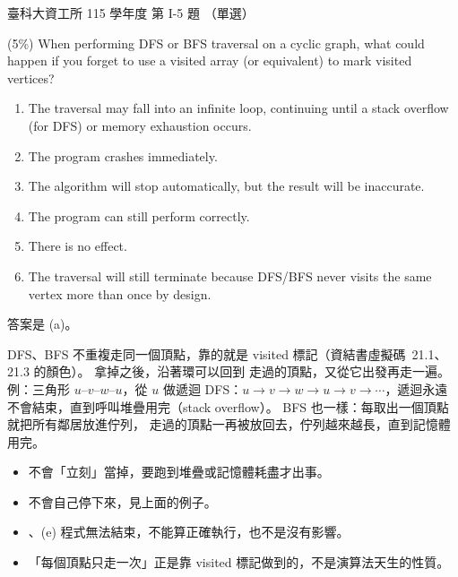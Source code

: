 \begin{pastexam}[label={px:ntust-115-ice-05}]{臺科大資工所 115 學年度 第 I-5 題}
（單選）

(5\%) When performing DFS or BFS traversal on a cyclic graph, what could happen if you forget to use a
visited array (or equivalent) to mark visited vertices?
\begin{enumerate}[label=(\alph*)]
\item The traversal may fall into an infinite loop, continuing until a stack overflow (for DFS) or memory
exhaustion occurs.
\item The program crashes immediately.
\item The algorithm will stop automatically, but the result will be inaccurate.
\item The program can still perform correctly.
\item There is no effect.
\item The traversal will still terminate because DFS/BFS never visits the same vertex more than once by
design.
\end{enumerate}
\end{pastexam}

\begin{pastsoln}
答案是 (a)。

DFS、BFS 不重複走同一個頂點，靠的就是 visited 標記（資結書虛擬碼~21.1、21.3 的顏色）。 拿掉之後，沿著環可以回到
走過的頂點，又從它出發再走一遍。 例：三角形 $u$--$v$--$w$--$u$，從 $u$ 做遞迴 DFS：$u \to v \to w \to u \to v \to
\cdots$，遞迴永遠不會結束，直到呼叫堆疊用完（stack overflow）。 BFS 也一樣：每取出一個頂點就把所有鄰居放進佇列，
走過的頂點一再被放回去，佇列越來越長，直到記憶體用完。

\begin{itemize}
\item[(b)] 不會「立刻」當掉，要跑到堆疊或記憶體耗盡才出事。
\item[(c)] 不會自己停下來，見上面的例子。
\item[(d)]、(e) 程式無法結束，不能算正確執行，也不是沒有影響。
\item[(f)] 「每個頂點只走一次」正是靠 visited 標記做到的，不是演算法天生的性質。
\end{itemize}
\end{pastsoln}
